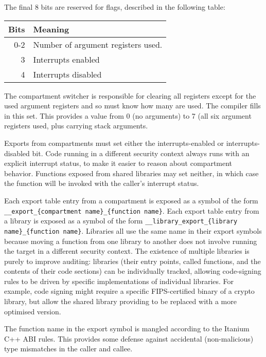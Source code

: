 The final 8 bits are reserved for flags, described in the following table:

\begin{center}
	\begin{tabular}{r|l}
		Bits & Meaning \\ \hline
		0-2 & Number of argument registers used. \\
		3 & Interrupts enabled \\
		4 & Interrupts disabled 
	\end{tabular}
\end{center}

The compartment switcher is responsible for clearing all registers except for the used argument registers and so must know how many are used.
The compiler fills in this set.
This provides a value from 0 (no arguments) to 7 (all six argument registers used, plus  carrying stack arguments.

Exports from compartments must set either the interrupts-enabled or interrupts-disabled bit.
Code running in a different security context always runs with an explicit interrupt status, to make it easier to reason about compartment behavior.
Functions exposed from shared libraries may set neither, in which case the function will be invoked with the caller's interrupt status.

Each export table entry from a compartment is exposed as a symbol of the form \texttt{\_\_export\_\{compartment name\}\_\{function name\}}.
Each export table entry from a library is exposed as a symbol of the form \texttt{\_\_library\_export\_\{library name\}\_\{function name\}}.
Libraries all use the same name in their export symbols because moving a function from one library to another does not involve running the target in a different security context.
The existence of multiple libraries is purely to improve auditing: libraries (their entry points, called functions, and the contents of their code sections) can be individually tracked, allowing code-signing rules to be driven by specific implementations of individual libraries.
For example, code signing might require a specific FIPS-certified binary of a crypto library, but allow the shared library providing  to be replaced with a more optimised version.

The function name in the export symbol is mangled according to the Itanium C++ ABI rules.
This provides some defense against accidental (non-malicious) type mismatches in the caller and callee.

